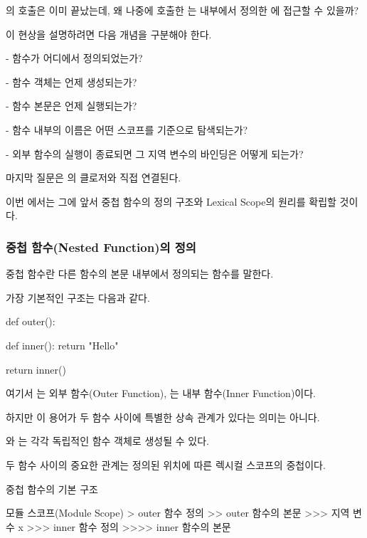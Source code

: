 의 호출은 이미 끝났는데, 왜 나중에 호출한 는  내부에서 정의한 에 접근할 수 있을까?

이 현상을 설명하려면 다음 개념을 구분해야 한다.

\begin{dhksmry}
    - 함수가 어디에서 정의되었는가?

    - 함수 객체는 언제 생성되는가?

    - 함수 본문은 언제 실행되는가?

    - 함수 내부의 이름은 어떤 스코프를 기준으로 탐색되는가?

    - 외부 함수의 실행이 종료되면 그 지역 변수의 바인딩은 어떻게 되는가?
\end{dhksmry}

마지막 질문은 의 클로저와 직접 연결된다.

이번 에서는 그에 앞서 중첩 함수의 정의 구조와 Lexical Scope의 원리를 확립할 것이다.

\subsubsection{중첩 함수(Nested Function)의 정의}

중첩 함수란 다른 함수의 본문 내부에서 정의되는 함수를 말한다.

가장 기본적인 구조는 다음과 같다.

\begin{dhkcode}
def outer():

    def inner():
        return "Hello"

    return inner()
\end{dhkcode}

여기서 는 외부 함수(Outer Function), 는 내부 함수(Inner Function)이다.

하지만 이 용어가 두 함수 사이에 특별한 상속 관계가 있다는 의미는 아니다.

와 는 각각 독립적인 함수 객체로 생성될 수 있다.

두 함수 사이의 중요한 관계는 정의된 위치에 따른 렉시컬 스코프의 중첩이다.

\begin{dhknote}
\begin{dhksmry}[centered]
중첩 함수의 기본 구조
\end{dhksmry}
\end{dhknote}

\begin{dhkdir}[in=6]
모듈 스코프(Module Scope)
> outer 함수 정의
>> outer 함수의 본문
>>> 지역 변수 x
>>> inner 함수 정의
>>>> inner 함수의 본문
\end{dhkdir}

